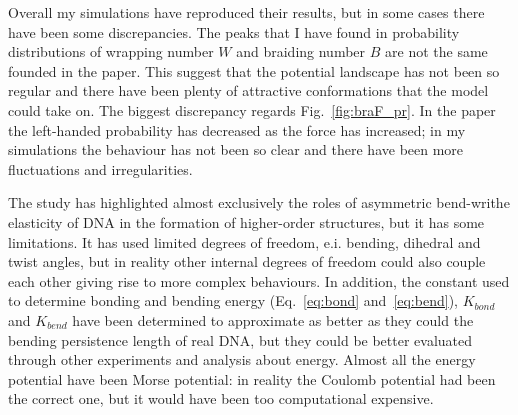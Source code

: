 \documentclass[a4paper,10pt]{article}
\begin{document}
Overall my simulations have reproduced their results, but in some cases there have been some discrepancies.
The peaks that I have found in probability distributions of wrapping number $W$ and braiding number $B$ are not the same founded in the paper.
This suggest that the potential landscape has not been so regular and there have been plenty of attractive conformations that the model could take on.
The biggest discrepancy regards Fig.~\ref{fig:braF_pr}.
In the paper the left-handed probability has decreased as the force has increased; in my simulations the behaviour has not been so clear and there have been more fluctuations and irregularities.

The study has highlighted almost exclusively the roles of asymmetric bend-writhe elasticity of DNA in the formation of higher-order structures, but it has some limitations.
It has used limited degrees of freedom, e.i. bending, dihedral and twist angles, but in reality other internal degrees of freedom could also couple each other giving rise to more complex behaviours.
In addition, the constant used to determine bonding and bending energy (Eq.~\ref{eq:bond} and~\ref{eq:bend}), $K_{bond}$ and $K_{bend}$ have been determined to approximate as better as they could the bending persistence length  of real DNA, but they could be better evaluated through other experiments and analysis about energy.
Almost all the energy potential have been Morse potential: in reality the Coulomb potential had been the correct one, but it would have been too computational expensive.

\clearpage
{}
\printbibliography
\end{document}
